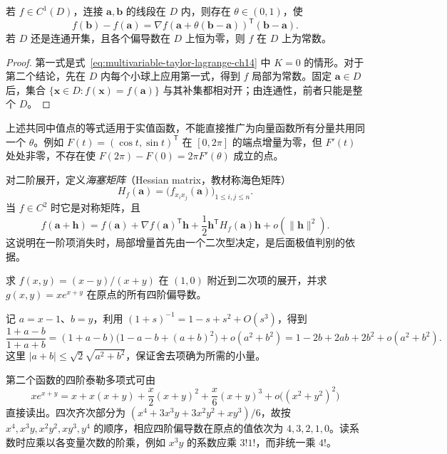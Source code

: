 \documentclass[UTF8,12pt,a4paper,fontset=fandol]{ctexbook}
\begin{document}
\begin{corollary}
\label{cor:multivariable-mean-value-ch14}
若 $f\in C^1(D)$，连接 $\boldsymbol a,\boldsymbol b$ 的线段在 $D$ 内，则存在 $\theta\in(0,1)$，使
\[
    f(\boldsymbol b)-f(\boldsymbol a)
    =\nabla f(\boldsymbol a+\theta(\boldsymbol b-\boldsymbol a))^{\mathsf T}
       (\boldsymbol b-\boldsymbol a).
\]
若 $D$ 还是连通开集，且各个偏导数在 $D$ 上恒为零，则 $f$ 在 $D$ 上为常数。
\end{corollary}
\begin{proof}
第一式是式~\eqref{eq:multivariable-taylor-lagrange-ch14} 中 $K=0$ 的情形。对于第二个结论，先在 $D$ 内每个小球上应用第一式，得到 $f$ 局部为常数。固定 $\boldsymbol a\in D$ 后，集合 $\{\boldsymbol x\in D:f(\boldsymbol x)=f(\boldsymbol a)\}$ 与其补集都相对开；由连通性，前者只能是整个 $D$。
\end{proof}

上述共同中值点的等式适用于实值函数，不能直接推广为向量函数所有分量共用同一个 $\theta$。例如 $F(t)=(\cos t,\sin t)^{\mathsf T}$ 在 $[0,2\pi]$ 的端点增量为零，但 $F'(t)$ 处处非零，不存在使 $F(2\pi)-F(0)=2\pi F'(\theta)$ 成立的点。

对二阶展开，定义\emph{海塞矩阵}（Hessian matrix，教材称海色矩阵）
\[
    H_f(\boldsymbol a)=\bigl(f_{x_ix_j}(\boldsymbol a)\bigr)_{1\leq i,j\leq n}.
\]
当 $f\in C^2$ 时它是对称矩阵，且
\begin{equation}
\label{eq:second-order-taylor-peano-ch14}
    f(\boldsymbol a+\boldsymbol h)
    =f(\boldsymbol a)+\nabla f(\boldsymbol a)^{\mathsf T}\boldsymbol h
       +\frac12\boldsymbol h^{\mathsf T}H_f(\boldsymbol a)\boldsymbol h
       +o(\|\boldsymbol h\|^2).
\end{equation}
这说明在一阶项消失时，局部增量首先由一个二次型决定，是后面极值判别的依据。

\begin{example}
\label{ex:multivariable-taylor-by-expansion-ch14}
求 $f(x,y)=(x-y)/(x+y)$ 在 $(1,0)$ 附近到二次项的展开，并求 $g(x,y)=xe^{x+y}$ 在原点的所有四阶偏导数。
\end{example}
\begin{solve}
记 $a=x-1$、$b=y$，利用 $(1+s)^{-1}=1-s+s^2+O(s^3)$，得到
\[
    \frac{1+a-b}{1+a+b}
    =(1+a-b)\bigl(1-a-b+(a+b)^2\bigr)
       +o(a^2+b^2)
    =1-2b+2ab+2b^2+o(a^2+b^2).
\]
这里 $|a+b|\leq\sqrt2\sqrt{a^2+b^2}$，保证舍去项确为所需的小量。

第二个函数的四阶泰勒多项式可由
\[
    xe^{x+y}
    =x+x(x+y)+\frac{x}{2}(x+y)^2+\frac{x}{6}(x+y)^3
       +o\bigl((x^2+y^2)^2\bigr)
\]
直接读出。四次齐次部分为 $(x^4+3x^3y+3x^2y^2+xy^3)/6$，故按 $x^4,x^3y,x^2y^2,xy^3,y^4$ 的顺序，相应四阶偏导数在原点的值依次为 $4,3,2,1,0$。读系数时应乘以各变量次数的阶乘，例如 $x^3y$ 的系数应乘 $3!1!$，而非统一乘 $4!$。
\end{solve}
\end{document}

